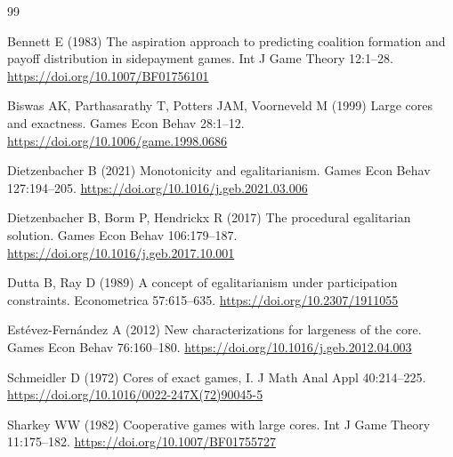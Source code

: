 \documentclass[11pt]{article}
\begin{document}
\begin{thebibliography}{99}

Bennett E (1983) The aspiration approach to predicting coalition formation
and payoff distribution in sidepayment games.
Int J Game Theory 12:1--28.
\url{https://doi.org/10.1007/BF01756101}

Biswas AK, Parthasarathy T, Potters JAM, Voorneveld M (1999) Large cores
and exactness. Games Econ Behav 28:1--12.
\url{https://doi.org/10.1006/game.1998.0686}

Dietzenbacher B (2021) Monotonicity and egalitarianism.
Games Econ Behav 127:194--205.
\url{https://doi.org/10.1016/j.geb.2021.03.006}

Dietzenbacher B, Borm P, Hendrickx R (2017) The procedural egalitarian
solution. Games Econ Behav 106:179--187.
\url{https://doi.org/10.1016/j.geb.2017.10.001}

Dutta B, Ray D (1989) A concept of egalitarianism under participation
constraints. Econometrica 57:615--635.
\url{https://doi.org/10.2307/1911055}

Est\'evez-Fern\'andez A (2012) New characterizations for largeness of the
core. Games Econ Behav 76:160--180.
\url{https://doi.org/10.1016/j.geb.2012.04.003}

Schmeidler D (1972) Cores of exact games, I.
J Math Anal Appl 40:214--225.
\url{https://doi.org/10.1016/0022-247X(72)90045-5}

Sharkey WW (1982) Cooperative games with large cores.
Int J Game Theory 11:175--182.
\url{https://doi.org/10.1007/BF01755727}

\end{thebibliography}
\end{document}
